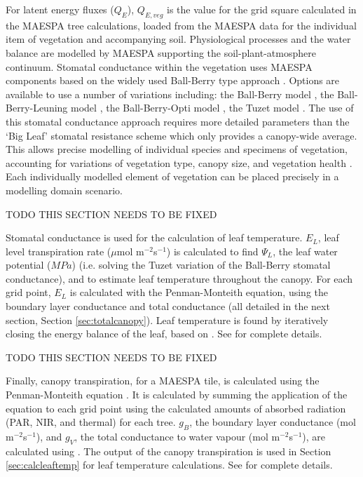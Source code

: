 \documentclass[final,3p,times,authoryear]{elsarticle}
\begin{document}
For latent energy fluxes ($Q_{E}$), $Q_{E,veg}$ is the value for the grid square calculated in the MAESPA tree calculations, loaded from the MAESPA data for the individual item of vegetation and accompanying soil. Physiological processes and the water balance are modelled by MAESPA supporting the soil-plant-atmosphere continuum. Stomatal conductance within the vegetation uses MAESPA components based on the widely used Ball-Berry type approach \citep{Ball1987,Duursma2012}. Options are available to use a number of variations including: the Ball-Berry model \citep{Ball1987}, the Ball-Berry-Leuning model \citep{Leuning1995}, the Ball-Berry-Opti model \citep{Medlyn2011}, the Tuzet model \citep{Tuzet2003}. The use of this stomatal conductance approach requires more detailed parameters than the `Big Leaf' stomatal resistance scheme \citep{Bailey1981,Kowalczyk1991} which only provides a canopy-wide average. This allows precise modelling of individual species and specimens of vegetation, accounting for variations of vegetation type, canopy size, and vegetation health \citep{Duursma2012}. Each individually modelled element of vegetation can be placed precisely in a modelling domain scenario.

TODO THIS SECTION NEEDS TO BE FIXED
 

Stomatal conductance is used for the calculation of leaf temperature. $E_{L}$, leaf level transpiration rate ($\mu$mol m$^{-2}$s$^{-1}$) is calculated to find $\Psi_{L}$, the leaf water potential ($MPa$) (i.e. solving the Tuzet variation of the Ball-Berry stomatal conductance), and to estimate leaf temperature throughout the canopy. For each grid point, $E_{L}$ is calculated with the Penman-Monteith equation, using the boundary layer conductance and total conductance (all detailed in the next section, Section \ref{sec:totalcanopy}). Leaf temperature is found by iteratively closing the energy balance of the leaf, based on \cite{Wang1998}. See \cite{Duursma2012} for complete details.

\label{sec:totalcanopy}
TODO THIS SECTION NEEDS TO BE FIXED

Finally, canopy transpiration, for a MAESPA tile, is calculated using the Penman-Monteith equation \citep{Penman1948,Monteith1965}. It is calculated by summing the application of the equation to each grid point using the calculated amounts of absorbed radiation (PAR, NIR, and thermal) for each tree. $g_{B}$, the boundary layer conductance (mol m$^{-2}$s$^{-1}$), and $g_{V}$, the total conductance to water vapour (mol m$^{-2}$s$^{-1}$), are calculated using \cite{Jones1992}. The output of the canopy transpiration is used in Section \ref{sec:calcleaftemp} for leaf temperature calculations. See \cite{Duursma2012} for complete details.
\end{document}
